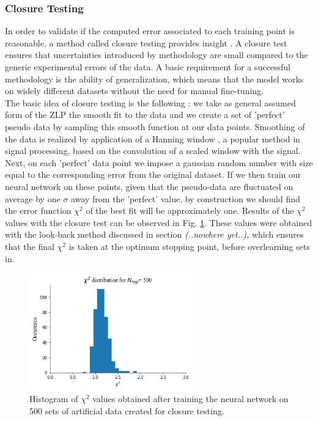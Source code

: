 \documentclass[11pt,a4paper]{article}
\numberwithin{equation}{section}
\numberwithin{figure}{section}
\numberwithin{table}{section}
\begin{document}
\subsubsection*{Closure Testing}
In order to validate if the computed error associated to each training point is reasonable, a method called closure testing provides insight \cite{Ball:2015oha}. A closure test ensures that uncertainties introduced by methodology are small compared to the generic experimental errors of the data. A basic requirement for a successful methodology is the ability of generalization, which means that the model works on widely different datasets without the need for manual fine-tuning.\\
The basic idea of closure testing is the following \cite{Ball:2015oha}: we take as general assumed form of the ZLP the smooth fit to the data and we create a set of 'perfect' pseudo data by sampling this smooth function at our data points. Smoothing of the data is realized by application of a Hanning window \cite{Essenwanger:1986}, a popular method in signal processing, based on the convolution of a scaled window with the signal. \\
Next, on each 'perfect' data point we impose a gaussian random number with size equal to the corresponding error from the original dataset. If we then train our neural network on these points, given that the pseudo-data are fluctuated on average by one $\sigma$ away from the 'perfect' value, by construction we should find the error function $\chi^2$ of the best fit will be approximately one. Results of the $\chi^2$ values with the closure test can be observed in Fig. \ref{closure1}. These values were obtained with the look-back method discussed in section \textit{ (..nowhere yet..),} which ensures that the final $\chi^2$ is taken at the optimum stopping point, before overlearning sets in.

\begin{figure}[H]
    \centering
    \includegraphics[width=70mm]{plots/chi2.png}
    \caption{Histogram of $\chi^2$ values obtained after training the neural network on 500 sets of artificial data created for closure testing.}
    \label{closure1}
\end{figure}
\end{document}
